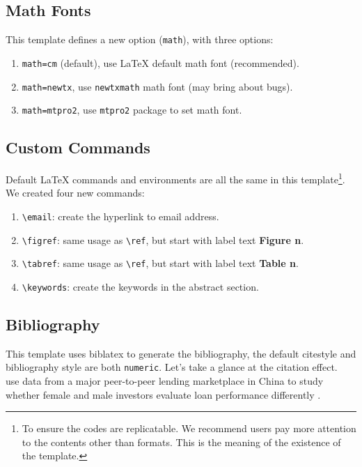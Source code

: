 \documentclass[lang=cn,a4paper,bibend=bibtex]{elegantcs}
\begin{document}
\subsection{Math Fonts}

This template defines a new option (\lstinline{math}), with three options:

\begin{enumerate}
  \item \lstinline{math=cm} (default), use \LaTeX{} default math font (recommended).
  \item \lstinline{math=newtx}, use \lstinline{newtxmath} math font (may bring about bugs).
  \item \lstinline{math=mtpro2}, use \lstinline{mtpro2} package to set math font.
\end{enumerate}


\subsection{Custom Commands}
Default \LaTeX{} commands and environments are all the same in this template\footnote{To ensure the codes are replicatable. We recommend users pay more attention to the contents other than formats. This is the meaning of the existence of the template.}. We created four new commands:
\begin{enumerate}
  \item \lstinline{\email}: create the hyperlink to email address.
  \item \lstinline{\figref}: same usage as \lstinline{\ref}, but start with label text \textbf{Figure n}.
  \item \lstinline{\tabref}: same usage as \lstinline{\ref}, but start with label text \textbf{Table n}.
  \item \lstinline{\keywords}: create the keywords in the abstract section.
\end{enumerate}


\subsection{Bibliography}

This template uses biblatex to generate the bibliography, the default citestyle and bibliography style are both \lstinline{numeric}. Let's take a glance at the citation effect. ~\cite{en1} use data from a major peer-to-peer lending \cite{en3} marketplace in China to study whether female and male investors evaluate loan performance differently \parencite{en2}.
\end{document}

